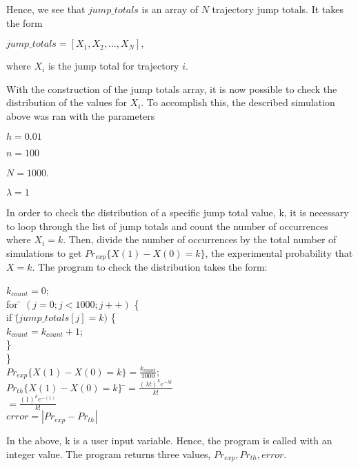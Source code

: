 \documentclass{article}
\begin{document}
\noindent Hence, we see that $jump\_totals$ is an array of $N$ trajectory jump totals. It takes the form\newline
\centerline{$jump\_totals = [X_{1}, X_{2}, \ldots, X_{N}],$}\newline
where $X_{i}$ is the jump total for trajectory $i$.\pagebreak

\indent With the construction of the jump totals array, it is now possible to check the distribution of the values for $X_{i}$. To accomplish this, the described simulation above was ran with the parameters \newline
\centerline{$h = 0.01$}\newline
\centerline{$n = 100$}\newline
\centerline{$N = 1000$.}\newline
\centerline{$\lambda = 1$}\newline

\noindent In order to check the distribution of a specific jump total value, k, it is necessary to loop through the list of jump totals and count the number of occurrences where $X_{i} = k$. Then, divide the number of occurrences by the total number of simulations to get $Pr_{exp}\{X(1) - X(0) = k\} $, the experimental probability that $X = k$.    The program to check the distribution takes the form:
\begin{tabbing}
$k_{count} = 0$;\\
for \= $(j = 0;j<1000;j++)$ \{ \\
\> if \= ($jump\_totals[j] = k) $ \{\\
\> \> $ k_{count} = k_{count} + 1$;\\
\> \}\\
\} \\
$Pr_{exp}\{X(1) - X(0) = k \} = \frac{k_{count}}{1000}$;\\
$Pr_{th}\{X(1) - X(0) = k \} $ \=$=  \frac{(\lambda t)^{k} e^{-\lambda t}}{k!}$\\
\>  $=\frac{(1)^{k} e^{-(1)}}{k!}$ \\
$error = |Pr_{exp} - Pr_{th}|$
\end{tabbing}
\noindent In the above, k is a user input variable. Hence, the program is called with an integer value. The program returns three values, $Pr_{exp},Pr_{th}, error$.
\end{document}
